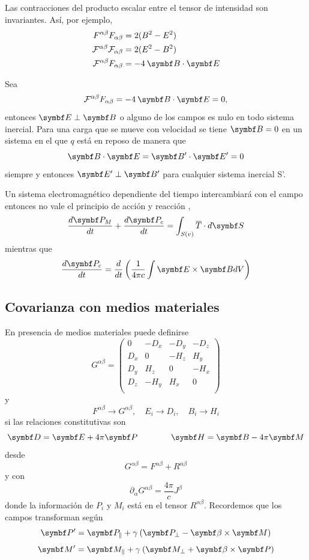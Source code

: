 \documentclass[10pt,oneside]{CBFT_book}
\begin{document}
Las contracciones del producto escalar entre el tensor de intensidad son invariantes. Así, por ejemplo,
\begin{align*}
	F^{\alpha\beta}F_{\alpha\beta} &= 2( B^2 - E^2 ) \\
	\mathcal{F}^{\alpha\beta}\mathcal{F}_{\alpha\beta} &= 2( E^2 - B^2 ) \\
	\mathcal{F}^{\alpha\beta}F_{\alpha\beta} &= -4 \: \pe{B}{E}
\end{align*}

Sea 
\[
	\mathcal{F}^{\alpha\beta}F_{\alpha\beta} = -4 \: \pe{B}{E} = 0,
\]
entonces $\vb{E} \perp \vb{B}$ o alguno de los campos es nulo en todo sistema inercial. Para una carga 
que se mueve con velocidad  se tiene $\vb{B}=0$ en un sistema en el que $q$ está en reposo de manera
que 
\[
	\pe{B}{E} = \pe{B'}{E'} = 0
\]
siempre y entonces $\vb{E'} \perp \vb{B'}$ para cualquier sistema inercial S'.

Un sistema electromagnético dependiente del tiempo intercambiará  con el campo entonces no vale el
principio de acción y reacción ,
\[
	\dtot{\vb{P}_M}{t} + \dtot{\vb{P}_c}{t} = \int_{S(v)} \overline{T}\cdot d\vb{S}
\]
mientras que 
\[
	\dtot{\vb{P}_c}{t} = \dtot{}{t} \left( \frac{1}{4\pi c} \int \pv{E}{B} dV \right)
\]

\subsection{Covarianza con medios materiales}

En presencia de medios materiales puede definirse
\[
	G^{\alpha\beta} =
	\begin{pmatrix}
	 0 & -D_x & -D_y & -D_z \\
	 D_x & 0 & -H_z & H_y \\
	 D_y & H_z & 0 & -H_x \\
	 D_z & -H_y & H_x & 0 \\
	\end{pmatrix}
\]
y 
\[
	F^{\alpha\beta} \to G^{\alpha\beta}, \quad E_i \to D_i, \quad B_i \to H_i
\]
si las relaciones constitutivas son 
\[
	\vb{D} = \vb{E} + 4\pi\vb{P} \qquad\qquad \vb{H} = \vb{B} - 4\pi\vb{M}
\]
desde 
\[
	G^{\alpha\beta} = F^{\alpha\beta} + R^{\alpha\beta}
\]
y con 
\[
	\partial_\alpha G^{\alpha\beta} = \frac{4\pi}{c} J^\beta
\]
donde la información de $P_i$ y $M_i$ está en el tensor $R^{\alpha\beta}$.
Recordemos que los campos transforman según 
\[
	\vb{P}' = \vb{P}_\parallel + \gamma \: ( \vb{P}_\perp  - \pv{\beta}{M} )
\]
\[
	\vb{M}' = \vb{M}_\parallel + \gamma \: ( \vb{M}_\perp  + \pv{\beta}{P} )
\]
\end{document}
